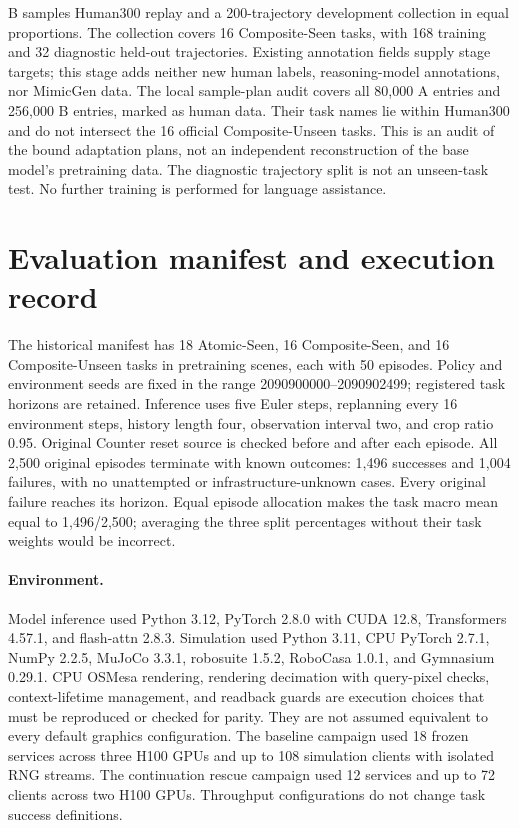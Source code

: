 B samples Human300 replay and a 200-trajectory development collection in equal proportions. The collection covers 16 Composite-Seen tasks, with 168 training and 32 diagnostic held-out trajectories. Existing annotation fields supply stage targets; this stage adds neither new human labels, reasoning-model annotations, nor MimicGen data. The local sample-plan audit covers all 80,000 A entries and 256,000 B entries, marked as human data. Their task names lie within Human300 and do not intersect the 16 official Composite-Unseen tasks. This is an audit of the bound adaptation plans, not an independent reconstruction of the base model's pretraining data. The diagnostic trajectory split is not an unseen-task test. No further training is performed for language assistance.

\section{Evaluation manifest and execution record}
\label{s:execution}
The historical manifest has 18 Atomic-Seen, 16 Composite-Seen, and 16 Composite-Unseen tasks in pretraining scenes, each with 50 episodes. Policy and environment seeds are fixed in the range 2090900000--2090902499; registered task horizons are retained. Inference uses five Euler steps, replanning every 16 environment steps, history length four, observation interval two, and crop ratio 0.95. Original Counter reset source is checked before and after each episode. All 2,500 original episodes terminate with known outcomes: 1,496 successes and 1,004 failures, with no unattempted or infrastructure-unknown cases. Every original failure reaches its horizon. Equal episode allocation makes the task macro mean equal to 1,496/2,500; averaging the three split percentages without their task weights would be incorrect.

\paragraph{Environment.}
Model inference used Python 3.12, PyTorch 2.8.0 with CUDA 12.8, Transformers 4.57.1, and flash-attn 2.8.3. Simulation used Python 3.11, CPU PyTorch 2.7.1, NumPy 2.2.5, MuJoCo 3.3.1, robosuite 1.5.2, RoboCasa 1.0.1, and Gymnasium 0.29.1. CPU OSMesa rendering, rendering decimation with query-pixel checks, context-lifetime management, and readback guards are execution choices that must be reproduced or checked for parity. They are not assumed equivalent to every default graphics configuration. The baseline campaign used 18 frozen services across three H100 GPUs and up to 108 simulation clients with isolated RNG streams. The continuation rescue campaign used 12 services and up to 72 clients across two H100 GPUs. Throughput configurations do not change task success definitions.

